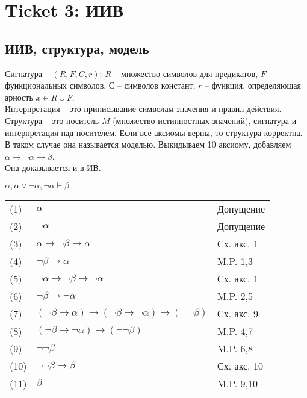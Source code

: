 \section{Ticket 3: ИИВ}
\label{sec-5}
\subsection{ИИВ, структура, модель}
\label{sec-5-1}
Сигнатура -- $(R, F, C, r)$: $R$ -- множество символов для предикатов, $F$ -- функциональных символов, $С$ -- символов констант, $r$ -- функция, определяющая арность $x \in R \cup F$. \\ 
Интерпретация -- это приписывание символам значения и правил действия. \\
Структура -- это носитель $M$ (множество истинностных значений), сигнатура и интерпретация над носителем.
Если все аксиомы верны, то структура корректна.
В таком случае она называется моделью.
Выкидываем 10 аксиому, добавляем $\alpha \rightarrow \neg \alpha \rightarrow \beta$.\\

Она доказывается и в ИВ.
\begin{lemma} 
$\alpha, \alpha \vee \neg \alpha, \neg \alpha \vdash \beta$
\end{lemma}
\begin{tabular}{lll}
(1) & $\alpha$& Допущение\\
(2) & $\neg \alpha$& Допущение\\
(3) & $\alpha \rightarrow \neg \beta \rightarrow \alpha$& Сх. акс. 1\\
(4) & $\neg \beta \rightarrow \alpha$& M.P. 1,3\\
(5) & $\neg \alpha \rightarrow \neg \beta \rightarrow \neg \alpha$& Сх. акс. 1\\
(6) & $\neg \beta \rightarrow \neg \alpha$& M.P. 2,5\\
(7) & $(\neg \beta \rightarrow \alpha) \rightarrow (\neg \beta \rightarrow \neg \alpha) \rightarrow (\neg \neg \beta)$& Сх. акс. 9\\
(8) & $(\neg \beta \rightarrow \neg \alpha) \rightarrow (\neg \neg \beta)$& M.P. 4,7\\
(9) & $\neg \neg \beta$& M.P. 6,8\\
(10) & $\neg \neg \beta \rightarrow \beta$& Сх. акс. 10\\
(11) & $\beta$& M.P. 9,10\\
\end{tabular}


